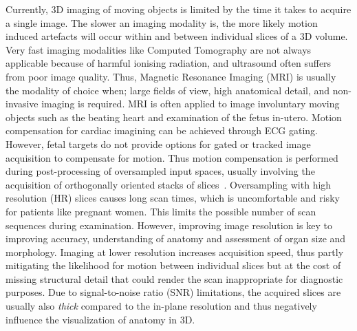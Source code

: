 \documentclass[runningheads,a4paper]{llncs}
\makeatletter
\let\origsection\section
\renewcommand\section{\@ifstar{\starsection}{\nostarsection}}
\newcommand\nostarsection[1]
{\sectionprelude\origsection{#1}\sectionpostlude}
\newcommand\starsection[1]
{\sectionprelude\origsection*{#1}\sectionpostlude}
\newcommand\sectionprelude{%
  \vspace{-2mm}
}
\newcommand\sectionpostlude{%
  \vspace{0mm}
}
\makeatother
\begin{document}
\vspace{-2mm}
\section{Introduction}
\vspace{-1mm}
\label{sec:intro}
\parskip0pt
Currently, 3D imaging of moving objects is limited by the time it takes to acquire a single image. The slower an imaging modality is, the more likely motion induced artefacts will occur within and between individual slices of a 3D volume. 
Very fast imaging modalities like Computed Tomography are not always applicable because of harmful ionising radiation, and ultrasound often suffers from poor image quality. Thus, Magnetic Resonance Imaging (MRI) is usually the modality of choice when; large fields of view, high anatomical detail, and non-invasive imaging is required. MRI is often applied to image involuntary moving objects such as the beating heart and examination of the fetus in-utero. Motion compensation for cardiac imagining can be achieved through ECG gating.
However, fetal targets do not provide options for gated or tracked image acquisition to compensate for motion. Thus motion compensation is performed during post-processing of oversampled input spaces, usually involving the acquisition of orthogonally oriented stacks of slices~\cite{kainz2015fast}. Oversampling with high resolution (HR) slices causes long scan times, which is uncomfortable and risky for patients like pregnant women. This limits the possible number of scan sequences during examination. However, improving image resolution is key to improving accuracy, understanding of anatomy and assessment of organ size and morphology. Imaging at lower resolution increases acquisition speed, thus partly mitigating the likelihood for motion between individual slices but at the cost of missing structural detail that could render the scan inappropriate for diagnostic purposes. Due to signal-to-noise ratio (SNR) limitations, the acquired slices are usually also \emph{thick} compared to the in-plane resolution and thus negatively influence the visualization of anatomy in 3D.
\end{document}
